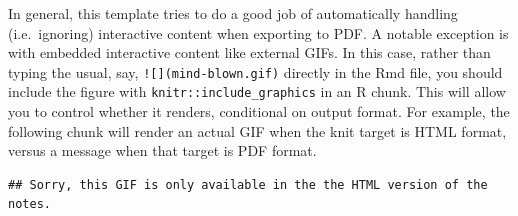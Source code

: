 \documentclass[
]{article}
\begin{document}
In general, this template tries to do a good job of automatically
handling (i.e.~ignoring) interactive content when exporting to PDF. A
notable exception is with embedded interactive content like external
GIFs. In this case, rather than typing the usual, say,
\texttt{!{[}{]}(mind-blown.gif)} directly in the Rmd file, you should
include the figure with \texttt{knitr::include\_graphics} in an R chunk.
This will allow you to control whether it renders, conditional on output
format. For example, the following chunk will render an actual GIF when
the knit target is HTML format, versus a message when that target is PDF
format.

\begin{verbatim}
## Sorry, this GIF is only available in the the HTML version of the notes.
\end{verbatim}
\end{document}
